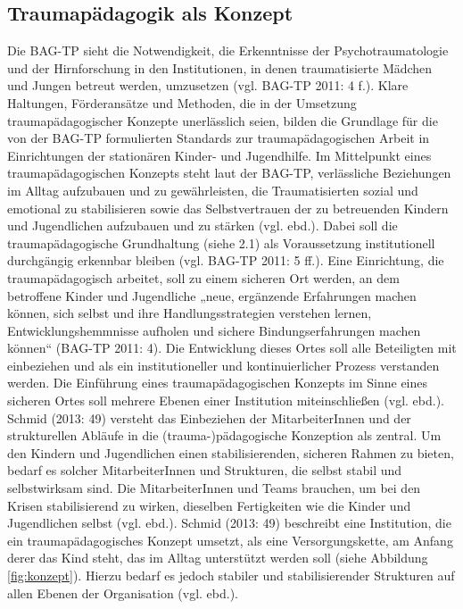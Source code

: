 \subsection{Traumapädagogik als Konzept}
Die BAG-TP sieht die Notwendigkeit, die Erkenntnisse der Psychotraumatologie und der Hirnforschung in den Institutionen, in denen traumatisierte Mädchen und Jungen betreut werden, umzusetzen (vgl. BAG-TP 2011: 4 f.). Klare Haltungen, F{\"o}rderans{\"a}tze und Methoden, die in der Umsetzung traumap{\"a}dagogischer Konzepte unerl{\"a}sslich seien, bilden die Grundlage f{\"u}r die von der BAG-TP formulierten Standards zur traumap{\"a}dagogischen Arbeit in Einrichtungen der station{\"a}ren Kinder- und Jugendhilfe. Im Mittelpunkt eines traumapädagogischen Konzepts steht laut der BAG-TP, verlässliche Beziehungen im Alltag aufzubauen und zu gewährleisten, die Traumatisierten sozial und emotional zu stabilisieren sowie das Selbstvertrauen der zu betreuenden Kindern und Jugendlichen aufzubauen und zu stärken (vgl. ebd.). Dabei soll die traumapädagogische Grundhaltung (siehe 2.1) als Voraussetzung institutionell durchg{\"a}ngig erkennbar bleiben (vgl. BAG-TP 2011: 5 ff.). Eine Einrichtung, die traumapädagogisch arbeitet, soll zu einem sicheren Ort werden, an dem betroffene Kinder und Jugendliche „neue, erg{\"a}nzende Erfahrungen machen k{\"o}nnen, sich selbst und ihre Handlungsstrategien verstehen lernen, Entwicklungshemmnisse aufholen und sichere Bindungserfahrungen machen k{\"o}nnen“ (BAG-TP 2011: 4). Die Entwicklung dieses Ortes soll alle Beteiligten mit einbeziehen und als ein institutioneller und kontinuierlicher Prozess verstanden werden. Die Einführung eines traumapädagogischen Konzepts im Sinne eines sicheren Ortes soll mehrere Ebenen einer Institution miteinschließen (vgl. ebd.). Schmid (2013: 49) versteht das Einbeziehen der MitarbeiterInnen und der strukturellen Abläufe in die (trauma-)pädagogische Konzeption als zentral. Um den Kindern und Jugendlichen einen stabilisierenden, sicheren Rahmen zu bieten, bedarf es solcher MitarbeiterInnen und Strukturen, die selbst stabil und selbstwirksam sind. Die MitarbeiterInnen und Teams brauchen, um bei den Krisen stabilisierend zu wirken, dieselben Fertigkeiten wie die Kinder und Jugendlichen selbst (vgl. ebd.). Schmid (2013: 49) beschreibt eine Institution, die ein traumapädagogisches Konzept umsetzt, als eine Versorgungskette, am Anfang derer das Kind steht, das im Alltag unterstützt werden soll (siehe Abbildung \ref{fig:konzept}). Hierzu bedarf es jedoch stabiler und stabilisierender Strukturen auf allen Ebenen der Organisation (vgl. ebd.).

